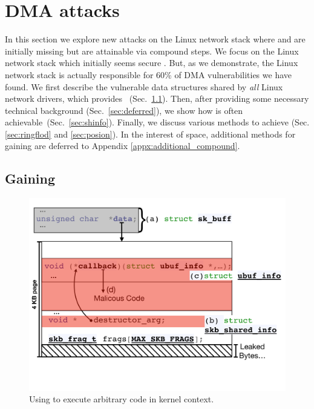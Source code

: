 \section{\Compound{} DMA attacks}\label{sec:linux_net}


In this section we explore new attacks on the Linux network stack where \motivation and \oportunity are initially missing but are attainable via compound steps.
We focus on the Linux network stack which initially seems secure \cite{thunder}. 
But, as we demonstrate, the Linux network stack is actually responsible for 60\% of DMA vulnerabilities we have found.
We first describe the vulnerable data structures shared by \emph{all} Linux network drivers, which provides \means~(Sec.~\ref{sec:shinfo_exploit}). Then, after providing some necessary technical background (Sec.~\ref{sec:deferred}), we show how \oportunity is often achievable~(Sec.~\ref{sec:shinfo}). Finally, we discuss various methods to achieve \motivation (Sec. \ref{sec:ringflod} and \ref{sec:posion}). 
In the interest of space, additional methods for gaining \motivation are deferred to Appendix \ref{appx:additional_compound}.

\subsection{Gaining \means}\label{sec:shinfo_exploit}
\begin{figure}[t]
    \centering
    \includegraphics[width=\linewidth]{figs/ubuf.pdf}
    \caption{Using \shinfo{} to execute arbitrary code in kernel context.}
    \label{fig:sh_info}
\end{figure}

